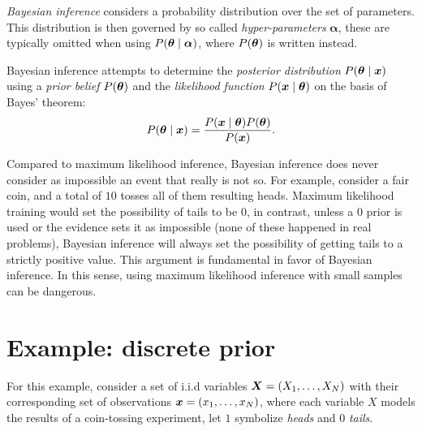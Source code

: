 

\emph{Bayesian inference} considers a probability distribution over the set of parameters. This distribution is then governed by so called \emph{hyper-parameters} \(\bm{\alpha}\), these are typically omitted when using \(P(\bm{\theta} \mid \bm{\alpha})\), where \(P(\bm{\theta})\) is written instead.

Bayesian inference attempts to determine the \emph{posterior distribution} \(P(\bm{\theta} \mid \bm{x})\) using a \emph{prior belief} \(P(\bm{\theta})\) and the \emph{likelihood function} \(P(\bm{x} \mid \bm{\theta})\) on the basis of Bayes' theorem:
\[
  P(\bm{\theta} \mid  \bm{x}) = \frac{P(\bm{x}  \mid  \bm{\theta})P(\bm{\theta})}{P(\bm{x})}.
\]

Compared to maximum likelihood inference, Bayesian inference does never consider as impossible an event that really is not so. For example, consider a fair coin, and a total of \(10\) tosses all of them resulting heads. Maximum likelihood training would set the possibility of tails to be \(0\), in contrast, unless a \(0\) prior is used or the evidence sets it as impossible (none of these happened in real problems), Bayesian inference will always set the possibility of getting tails to a strictly positive value. This argument is fundamental in favor of Bayesian inference. In this sense, using maximum likelihood inference with small samples can be dangerous.

\section{Example: discrete prior}

For this example, consider a set of i.i.d variables \(\bm{X} = (X_{1},\dots, X_{N})\) with their corresponding set of observations \(\bm{x} = (x_{1},\dots,x_{N})\), where each variable \(X\) models the results of a coin-tossing experiment, let \(1\) symbolize \emph{heads} and \(0\) \emph{tails}.

